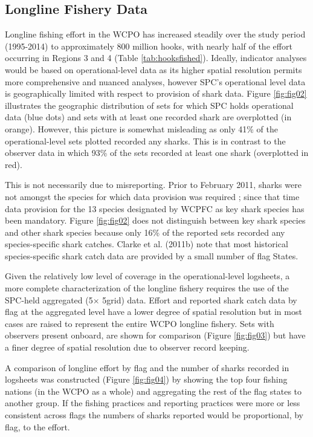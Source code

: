 \documentclass[12pt]{SCreport}
\begin{document}
\subsection{Longline Fishery Data}
  
Longline fishing effort in the WCPO has increased steadily over the study period (1995-2014) to approximately 800 million hooks, with nearly half of the effort occurring in Regions 3 and 4 (Table \ref{tab:hooksfished}).  Ideally, indicator analyses would be based on operational-level data as its higher spatial resolution permits more comprehensive and nuanced analyses, however SPC's operational level data is geographically limited with respect to provision of shark data.  Figure \ref{fig:fig02} illustrates the geographic distribution of sets for which SPC holds operational data (blue dots) and sets with at least one recorded shark are overplotted (in orange). However, this picture is somewhat misleading as only 41\% of the operational-level sets plotted recorded any sharks. This is in contrast to the observer data in which 93\% of the sets recorded at least one shark (overplotted in red).

This is not necessarily due to misreporting. Prior to February 2011, sharks were not amongst the species for which data provision was required \citep{WCPFC2011_a}; since that time data provision for the 13 species designated by WCPFC as key shark species has been mandatory. Figure \ref{fig:fig02} does not distinguish between key shark species and other shark species because only 16\% of the reported sets recorded any species-specific shark catches. Clarke et al. (2011b) note that most historical species-specific shark catch data are provided by a small number of flag States.

Given the relatively low level of coverage in the operational-level logsheets, a more complete characterization of the longline fishery requires the use of the SPC-held aggregated (5\degree $\times$ 5\degree grid) data. Effort and reported shark catch data by flag at the aggregated level have a lower degree of spatial resolution but in most cases are raised to represent the entire WCPO longline fishery. Sets with observers present onboard, are shown for comparison (Figure \ref{fig:fig03}) but have a finer degree of spatial resolution due to observer record keeping. 

A comparison of longline effort by flag and the number of sharks recorded in logsheets was constructed (Figure \ref{fig:fig04}) by showing the top four fishing nations (in the WCPO as a whole) and aggregating the rest of the flag states to another group. If the fishing practices and reporting practices were more or less consistent across flags the numbers of sharks reported would be proportional, by flag, to the effort.
\end{document}
